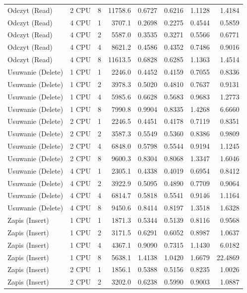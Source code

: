 \begin{table}[ht]
{\begin{tabular}{llcrrrrr}
Odczyt (Read) & 2 CPU & 8 & 11758.6 & 0.6727 & 0.6216 & 1.1128 & 1.4184 \\
Odczyt (Read) & 4 CPU & 1 & 3707.1 & 0.2698 & 0.2275 & 0.4544 & 0.5859 \\
Odczyt (Read) & 4 CPU & 2 & 5587.0 & 0.3535 & 0.3271 & 0.5566 & 0.6771 \\
Odczyt (Read) & 4 CPU & 4 & 8621.2 & 0.4586 & 0.4352 & 0.7486 & 0.9016 \\
Odczyt (Read) & 4 CPU & 8 & 11613.5 & 0.6828 & 0.6285 & 1.1363 & 1.4514 \\
Usuwanie (Delete) & 1 CPU & 1 & 2246.0 & 0.4452 & 0.4159 & 0.7055 & 0.8336 \\
Usuwanie (Delete) & 1 CPU & 2 & 3978.3 & 0.5020 & 0.4810 & 0.7637 & 0.9131 \\
Usuwanie (Delete) & 1 CPU & 4 & 5985.6 & 0.6628 & 0.5683 & 0.9683 & 1.2773 \\
Usuwanie (Delete) & 1 CPU & 8 & 7990.8 & 0.9904 & 0.8335 & 1.4268 & 6.6660 \\
Usuwanie (Delete) & 2 CPU & 1 & 2246.5 & 0.4451 & 0.4178 & 0.7119 & 0.8351 \\
Usuwanie (Delete) & 2 CPU & 2 & 3587.3 & 0.5549 & 0.5360 & 0.8386 & 0.9809 \\
Usuwanie (Delete) & 2 CPU & 4 & 6848.0 & 0.5798 & 0.5544 & 0.9194 & 1.1245 \\
Usuwanie (Delete) & 2 CPU & 8 & 9600.3 & 0.8304 & 0.8068 & 1.3347 & 1.6046 \\
Usuwanie (Delete) & 4 CPU & 1 & 2305.1 & 0.4338 & 0.4019 & 0.6954 & 0.8412 \\
Usuwanie (Delete) & 4 CPU & 2 & 3922.9 & 0.5095 & 0.4890 & 0.7709 & 0.9064 \\
Usuwanie (Delete) & 4 CPU & 4 & 6814.7 & 0.5818 & 0.5541 & 0.9146 & 1.1164 \\
Usuwanie (Delete) & 4 CPU & 8 & 9450.6 & 0.8414 & 0.8197 & 1.3518 & 1.6328 \\
Zapis (Insert) & 1 CPU & 1 & 1871.3 & 0.5344 & 0.5139 & 0.8116 & 0.9568 \\
Zapis (Insert) & 1 CPU & 2 & 3171.5 & 0.6291 & 0.6052 & 0.8987 & 1.0637 \\
Zapis (Insert) & 1 CPU & 4 & 4367.1 & 0.9090 & 0.7315 & 1.1430 & 6.0182 \\
Zapis (Insert) & 1 CPU & 8 & 5638.1 & 1.4138 & 1.0420 & 1.6679 & 22.4869 \\
Zapis (Insert) & 2 CPU & 1 & 1856.1 & 0.5388 & 0.5156 & 0.8235 & 1.0026 \\
Zapis (Insert) & 2 CPU & 2 & 3202.0 & 0.6238 & 0.5990 & 0.9003 & 1.0887 \\

\end{tabular}}
\end{table}
